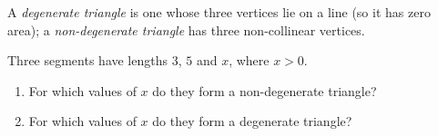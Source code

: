 A \emph{degenerate triangle} is one whose three vertices lie on a line (so it has zero area); a \emph{non-degenerate triangle} has three non-collinear vertices.

Three segments have lengths $3$, $5$ and $x$, where $x>0$.
\begin{enumerate}
\item[(a)] For which values of $x$ do they form a non-degenerate triangle?
\item[(b)] For which values of $x$ do they form a degenerate triangle?
\end{enumerate}
